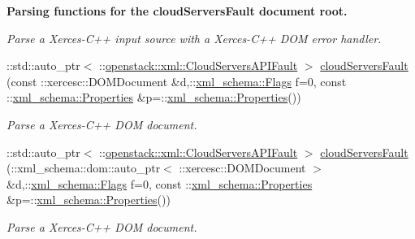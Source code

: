 \begin{Indent}{\bf Parsing functions for the cloudServersFault document root.}
\begin{DoxyCompactItemize}
\begin{DoxyCompactList}\small\item\em Parse a Xerces-\/C++ input source with a Xerces-\/C++ DOM error handler. \item\end{DoxyCompactList}\item 
::std::auto\_\-ptr$<$ ::\hyperlink{classopenstack_1_1xml_1_1CloudServersAPIFault}{openstack::xml::CloudServersAPIFault} $>$ \hyperlink{namespaceopenstack_1_1xml_ada95810d2f34fbdefc8716ca366402bd}{cloudServersFault} (const ::xercesc::DOMDocument \&d,::\hyperlink{namespacexml__schema_affb4c227cbd9aa7453dd1dc5a1401943}{xml\_\-schema::Flags} f=0, const ::\hyperlink{namespacexml__schema_ad27ce19a7ee1d3b1064092648898f64c}{xml\_\-schema::Properties} \&p=::\hyperlink{namespacexml__schema_ad27ce19a7ee1d3b1064092648898f64c}{xml\_\-schema::Properties}())
\begin{DoxyCompactList}\small\item\em Parse a Xerces-\/C++ DOM document. \item\end{DoxyCompactList}\item 
::std::auto\_\-ptr$<$ ::\hyperlink{classopenstack_1_1xml_1_1CloudServersAPIFault}{openstack::xml::CloudServersAPIFault} $>$ \hyperlink{namespaceopenstack_1_1xml_a7cc26ab6c5fd63129a54d85e837009b1}{cloudServersFault} (::xml\_\-schema::dom::auto\_\-ptr$<$ ::xercesc::DOMDocument $>$ \&d,::\hyperlink{namespacexml__schema_affb4c227cbd9aa7453dd1dc5a1401943}{xml\_\-schema::Flags} f=0, const ::\hyperlink{namespacexml__schema_ad27ce19a7ee1d3b1064092648898f64c}{xml\_\-schema::Properties} \&p=::\hyperlink{namespacexml__schema_ad27ce19a7ee1d3b1064092648898f64c}{xml\_\-schema::Properties}())
\begin{DoxyCompactList}\small\item\em Parse a Xerces-\/C++ DOM document. \item\end{DoxyCompactList}\end{DoxyCompactItemize}
\end{Indent}
